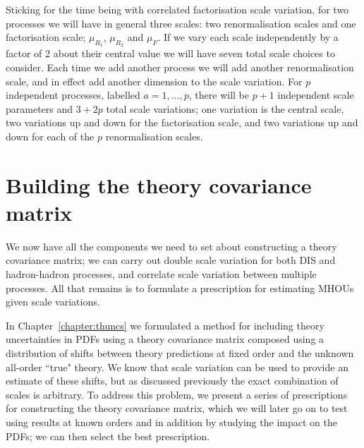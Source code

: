 Sticking for the time being with correlated factorisation scale variation, for two processes we will have in general three scales: two renormalisation scales and one factorisation scale; $\mu_{R_1}$, $\mu_{R_2}$ and $\mu_F$. If we vary each scale independently by a factor of 2 about their central value we will have seven total scale choices to consider. Each time we add another process we will add another renormalisation scale, and in effect add another dimension to the scale variation. For $p$ independent processes, labelled $a = 1, \ldots, p$, there will be $p+1$ independent scale parameters and $3 + 2p$ total scale variations; one variation is the central scale, two variations up and down for the factorisation scale, and two variations up and down for each of the $p$ renormalisation scales.
\section{Building the theory covariance matrix}
\label{sec:prescrip}
We now have all the components we need to set about constructing a theory covariance matrix; we can carry out double scale variation for both DIS and hadron-hadron processes, and correlate scale variation between multiple processes. All that remains is to formulate a prescription for estimating MHOUs given scale variations.

In Chapter~\ref{chapter:thuncs} we formulated a method for including theory uncertainties in PDFs using a theory covariance matrix composed using a distribution of shifts between theory predictions at fixed order and the unknown all-order ``true" theory. We know that scale variation can be used to provide an estimate of these shifts, but as discussed previously the exact combination of scales is arbitrary. To address this problem, we present a series of prescriptions for constructing the theory covariance matrix, which we will later go on to test using results at known orders and in addition by studying the impact on the PDFs; we can then select the best prescription.

